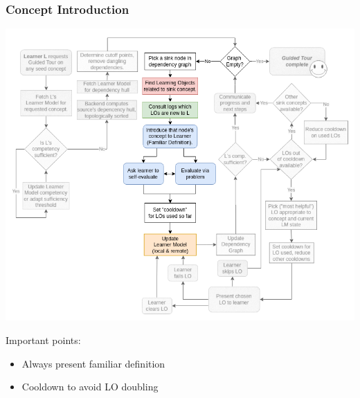 \documentclass[aspectratio=169, usenames, dvipsnames]{beamer}
\begin{document}
\begin{frame}
\frametitle{Concept Introduction}
\begin{minipage}{0.7\textwidth}
\vspace*{-10px}
\includegraphics[height=0.9\textheight,keepaspectratio]{images/gt_algorithm_square_step2}
\end{minipage}%
\begin{minipage}{0.3\textwidth}
Important points:
\bigskip
\begin{itemize}
\item Always present familiar definition\\
\item Cooldown to avoid LO doubling
\end{itemize}
\end{minipage}%
\end{frame}
\end{document}
